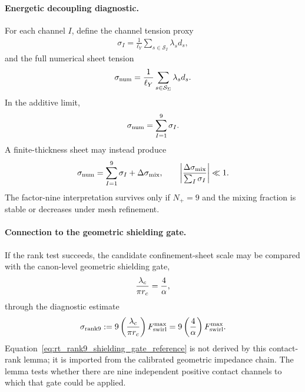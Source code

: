\paragraph{Energetic decoupling diagnostic.}
For each channel \(I\), define the channel tension proxy
\begin{align}
    \sigma_I
    =
    \frac{1}{\ell_Y}
    \sum_{s\in\mathcal S_I}\lambda_s d_s,
    \label{eq:rt_rank9_channel_tension}
\end{align}
and the full numerical sheet tension
\begin{align}
    \sigma_{\rm num}
    =
    \frac{1}{\ell_Y}
    \sum_{s\in\mathcal S_{\Sigma}}\lambda_s d_s .
    \label{eq:rt_rank9_numerical_sheet_tension}
\end{align}
In the additive limit,
\begin{align}
    \sigma_{\rm num}
    =
    \sum_{I=1}^{9}\sigma_I .
    \label{eq:rt_rank9_additive_tension_limit}
\end{align}
A finite-thickness sheet may instead produce
\begin{align}
    \sigma_{\rm num}
    =
    \sum_{I=1}^{9}\sigma_I
    +
    \Delta\sigma_{\rm mix},
    \qquad
    \left|
    \frac{\Delta\sigma_{\rm mix}}{\sum_I\sigma_I}
    \right|
    \ll1 .
    \label{eq:rt_rank9_mixed_tension}
\end{align}
The factor-nine interpretation survives only if \(N_+=9\) and the mixing fraction
is stable or decreases under mesh refinement.

\paragraph{Connection to the geometric shielding gate.}
If the rank test succeeds, the candidate confinement-sheet scale may be compared
with the canon-level geometric shielding gate,
\begin{align}
    \frac{\lambda_c}{\pi r_c}
    =
    \frac{4}{\alpha},
    \label{eq:rt_rank9_shielding_gate_reference}
\end{align}
through the diagnostic estimate
\begin{align}
    \sigma_{\rm rank9}
    :=
    9
    \left(\frac{\lambda_c}{\pi r_c}\right)
    F_{\rm swirl}^{\max}
    =
    9\left(\frac{4}{\alpha}\right)F_{\rm swirl}^{\max}.
    \label{eq:rt_rank9_tension_diagnostic}
\end{align}
Equation~\eqref{eq:rt_rank9_shielding_gate_reference} is not derived by this
contact-rank lemma; it is imported from the calibrated geometric impedance chain.
The lemma tests whether there are nine independent positive contact channels to
which that gate could be applied.

